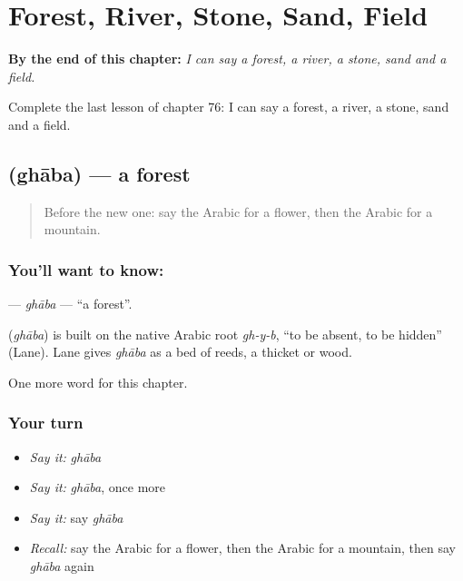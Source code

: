 
\chapter{Forest, River, Stone, Sand, Field}
\label{ch:ar-forest-river-stone-sand-field}

\begin{chapteropening}
\textbf{By the end of this chapter:} \emph{I can say a forest, a river, a stone, sand and a field.}

Complete the last lesson of chapter 76: I can say a forest, a river, a stone, sand and a field.
\end{chapteropening}

\section[\texorpdfstring{\ar{غابة} (ghāba)}{غابة (ghāba)}]{ (ghāba) — a forest}

\label{lesson:AR-C76-ghaba}



\begin{quote}
Before the new one: say the Arabic for a flower, then the Arabic for a mountain.
\end{quote}

\subsection*{You'll want to know: }
\textbf{} — \emph{ghāba} — \textquotedblleft{}a forest\textquotedblright{}.

\begin{cousinweb}
\textbf{} (\emph{ghāba}) is built on the native Arabic root \emph{gh-y-b}, \textquotedblleft{}to be absent, to be hidden\textquotedblright{} (Lane). Lane gives \emph{ghāba} as a bed of reeds, a thicket or wood.
\end{cousinweb}

\begin{grammarlens}[title={What you've built}]
One more word for this chapter.
\end{grammarlens}

\subsection*{Your turn}
\begin{itemize}
\raggedright
  \item \emph{Say it:} \emph{ghāba}
  \item \emph{Say it:} \emph{ghāba}, once more
  \item \emph{Say it:} say \emph{ghāba}
  \item \emph{Recall:} say the Arabic for a flower, then the Arabic for a mountain, then say \emph{ghāba} again
\end{itemize}

